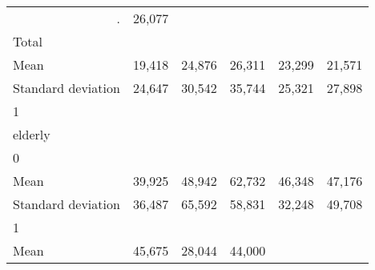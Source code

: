 \begin{tabular}{llllll}
  \multicolumn{1}{r}{.} &
  \multicolumn{1}{r}{26,077} \\
\multicolumn{1}{l}{\hspace{3em}Total} &
  \multicolumn{1}{|r}{} &
  \multicolumn{1}{r}{} &
  \multicolumn{1}{r}{} &
  \multicolumn{1}{r}{} &
  \multicolumn{1}{r}{} \\
\multicolumn{1}{l}{\hspace{4em}Mean} &
  \multicolumn{1}{|r}{19,418} &
  \multicolumn{1}{r}{24,876} &
  \multicolumn{1}{r}{26,311} &
  \multicolumn{1}{r}{23,299} &
  \multicolumn{1}{r}{21,571} \\
\multicolumn{1}{l}{\hspace{4em}Standard deviation} &
  \multicolumn{1}{|r}{24,647} &
  \multicolumn{1}{r}{30,542} &
  \multicolumn{1}{r}{35,744} &
  \multicolumn{1}{r}{25,321} &
  \multicolumn{1}{r}{27,898} \\
\multicolumn{1}{l}{\hspace{1em}1} &
  \multicolumn{1}{|r}{} &
  \multicolumn{1}{r}{} &
  \multicolumn{1}{r}{} &
  \multicolumn{1}{r}{} &
  \multicolumn{1}{r}{} \\
\multicolumn{1}{l}{\hspace{2em}elderly} &
  \multicolumn{1}{|r}{} &
  \multicolumn{1}{r}{} &
  \multicolumn{1}{r}{} &
  \multicolumn{1}{r}{} &
  \multicolumn{1}{r}{} \\
\multicolumn{1}{l}{\hspace{3em}0} &
  \multicolumn{1}{|r}{} &
  \multicolumn{1}{r}{} &
  \multicolumn{1}{r}{} &
  \multicolumn{1}{r}{} &
  \multicolumn{1}{r}{} \\
\multicolumn{1}{l}{\hspace{4em}Mean} &
  \multicolumn{1}{|r}{39,925} &
  \multicolumn{1}{r}{48,942} &
  \multicolumn{1}{r}{62,732} &
  \multicolumn{1}{r}{46,348} &
  \multicolumn{1}{r}{47,176} \\
\multicolumn{1}{l}{\hspace{4em}Standard deviation} &
  \multicolumn{1}{|r}{36,487} &
  \multicolumn{1}{r}{65,592} &
  \multicolumn{1}{r}{58,831} &
  \multicolumn{1}{r}{32,248} &
  \multicolumn{1}{r}{49,708} \\
\multicolumn{1}{l}{\hspace{3em}1} &
  \multicolumn{1}{|r}{} &
  \multicolumn{1}{r}{} &
  \multicolumn{1}{r}{} &
  \multicolumn{1}{r}{} &
  \multicolumn{1}{r}{} \\
\multicolumn{1}{l}{\hspace{4em}Mean} &
  \multicolumn{1}{|r}{45,675} &
  \multicolumn{1}{r}{28,044} &
  \multicolumn{1}{r}{44,000} &

\end{tabular}
